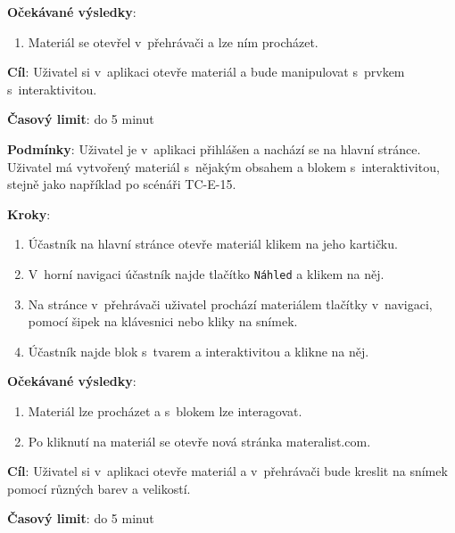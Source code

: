\textbf{Očekávané výsledky}:

\begin{enumerate}[leftmargin=1.4cm]
    \item Materiál se otevřel v~přehrávači a lze ním procházet.
\end{enumerate}



\vspace{1em}

\textbf{Cíl}: Uživatel si v~aplikaci otevře materiál a bude manipulovat s~prvkem s~interaktivitou.

\textbf{Časový limit}: do 5 minut

\textbf{Podmínky}:  Uživatel je v~aplikaci přihlášen a nachází se na hlavní stránce.  Uživatel má vytvořený materiál s~nějakým obsahem a blokem s~interaktivitou, stejně jako například po scénáři TC-E-15.

\textbf{Kroky}:

\begin{enumerate}[leftmargin=1.4cm]
    \item Účastník na hlavní stránce otevře materiál klikem na jeho kartičku.
    \item V~horní navigaci účastník najde tlačítko \verb|Náhled| a klikem na něj.
    \item Na stránce v~přehrávači uživatel prochází materiálem tlačítky v~navigaci, pomocí šipek na klávesnici nebo kliky na snímek.
    \item Účastník najde blok s~tvarem a interaktivitou a klikne na něj.
\end{enumerate}

\textbf{Očekávané výsledky}:

\begin{enumerate}[leftmargin=1.4cm]
    \item Materiál lze procházet a s~blokem lze interagovat.
    \item Po kliknutí na materiál se otevře nová stránka materalist.com.
\end{enumerate}






\vspace{1em}

\textbf{Cíl}: Uživatel si v~aplikaci otevře materiál a v~přehrávači bude kreslit na snímek pomocí různých barev a velikostí.

\textbf{Časový limit}: do 5 minut

